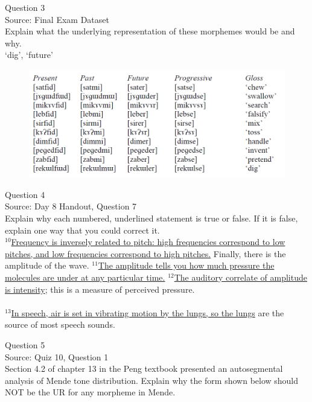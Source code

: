 \documentclass[12pt]{article}
\begin{document}
{\large Question 3}\\

Source: Final Exam Dataset\\

Explain what the underlying representation of these morphemes would be and why.\\

`dig', `future'

\begin{figure}[H]
\includegraphics{../images/final_dataset.png}
\end{figure}

\newpage

{\large Question 4}\\

Source: Day 8 Handout, Question 7\\

Explain why each numbered, underlined statement is true or false. If it is false, explain one way that you could correct it.\\

$^{10}$\ul{Frequency is inversely related to pitch: high frequencies correspond to low pitches, and low frequencies correspond to high pitches.} Finally, there is the amplitude of the wave. $^{11}$\ul{The amplitude tells you how much pressure the molecules are under at any particular time.} $^{12}$\ul{The auditory correlate of amplitude is intensity}; this is a measure of perceived pressure.\\\\$^{13}$\ul{In speech, air is set in vibrating motion by the lungs, so the lungs} are the source of most speech sounds.


\newpage

{\large Question 5}\\

Source: Quiz 10, Question 1\\

Section 4.2 of chapter 13 in the Peng textbook presented an autosegmental analysis of Mende tone distribution. Explain why the form shown below should NOT be the UR for any morpheme in Mende.\\
\end{document}
